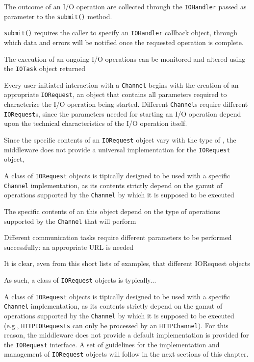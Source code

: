 The outcome of an I/O operation are collected through the \texttt{IOHandler} passed as parameter to the \texttt{submit()} method. 

\texttt{submit()} requires the caller to specify an \texttt{IOHandler} callback object, through which data and errors will be notified once the requested operation is complete.

The execution of an ongoing I/O operations can be monitored and altered using the \texttt{IOTask} object returned 






Every user-initiated interaction with a \texttt{Channel} begins with the creation of an appropriate \texttt{IORequest}, an object that contains all parameters required to characterize the I/O operation being started. Different \texttt{Channel}s require different \texttt{IORequest}s, since the parameters needed for starting an I/O operation depend upon the technical characteristics of the I/O operation itself.

Since the specific contents of an \texttt{IORequest} object vary with the type of , the middleware does not provide a universal implementation for the \texttt{IORequest} object, 


A class of \texttt{IORequest} objects is tipically designed to be used with a specific \texttt{Channel} implementation, as its contents strictly depend on the gamut of operations supported by the \texttt{Channel} by which it is supposed to be executed 

The specific contents of an this object depend on the type of operations supported by the \texttt{Channel} that will perform

Different communication tasks require different parameters to be performed successfully: an appropriate URL is needed 

It is clear, even from this short lists of examples, that different IORequest objects

As such, a class of \texttt{IORequest} objects is typically...

 A class of \texttt{IORequest} objects is tipically designed to be used with a specific \texttt{Channel} implementation, as its contents strictly depend on the gamut of operations supported by the \texttt{Channel} by which it is supposed to be executed (e.g., \texttt{HTTPIORequests} can only be processed by an \texttt{HTTPChannel}). For this reason, the middleware does not provide a default implementation is provided for the \texttt{IORequest} interface. A set of guidelines for the implementation and management of \texttt{IORequest} objects will follow in the next sections of this chapter.

